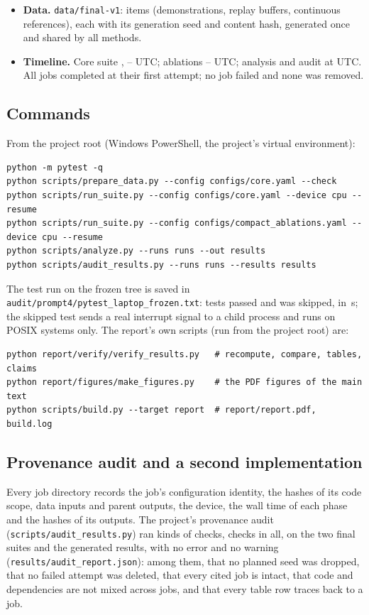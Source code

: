 \begin{itemize}[nosep]
\item \textbf{Data.} \texttt{data/final-v1}:  items (demonstrations, replay buffers, continuous references), each with its generation seed and content hash, generated once and shared by all methods.
\item \textbf{Timeline.} Core suite , -- UTC; ablations -- UTC; analysis and audit at  UTC. All  jobs completed at their first attempt; no job failed and none was removed.
\end{itemize}

\subsection{Commands}

From the project root (Windows PowerShell, the project's virtual environment):
{\footnotesize
\begin{verbatim}
python -m pytest -q
python scripts/prepare_data.py --config configs/core.yaml --check
python scripts/run_suite.py --config configs/core.yaml --device cpu --resume
python scripts/run_suite.py --config configs/compact_ablations.yaml --device cpu --resume
python scripts/analyze.py --runs runs --out results
python scripts/audit_results.py --runs runs --results results
\end{verbatim}
}
The test run on the frozen tree is saved in \texttt{audit/prompt4/pytest\_laptop\_frozen.txt}:  tests passed and  was skipped, in \,s; the skipped test sends a real interrupt signal to a child process and runs on POSIX systems only.
The report's own scripts (run from the project root) are:
{\small
\begin{verbatim}
python report/verify/verify_results.py   # recompute, compare, tables, claims
python report/figures/make_figures.py    # the PDF figures of the main text
python scripts/build.py --target report  # report/report.pdf, build.log
\end{verbatim}
}

\subsection{Provenance audit and a second implementation}

Every job directory records the job's configuration identity, the hashes of its code scope, data inputs and parent outputs, the device, the wall time of each phase and the hashes of its outputs.
The project's provenance audit (\texttt{scripts/audit\_results.py}) ran  kinds of checks,  checks in all, on the two final suites and the generated results, with no error and no warning (\texttt{results/audit\_report.json}): among them, that no planned seed was dropped, that no failed attempt was deleted, that every cited job is intact, that code and dependencies are not mixed across jobs, and that every table row traces back to a job.

